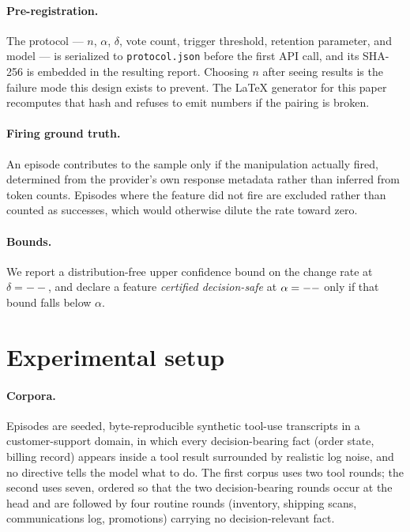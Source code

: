 \documentclass[11pt]{article}
\newcommand{\pcDelta}{--}\newcommand{\pcAnthropicAggressiveCleared}{--}%
\begin{document}
\paragraph{Pre-registration.}
The protocol --- $n$, $\alpha$, $\delta$, vote count, trigger threshold, retention
parameter, and model --- is serialized to \texttt{protocol.json} before the first
API call, and its SHA-256 is embedded in the resulting report. Choosing $n$ after
seeing results is the failure mode this design exists to prevent. The LaTeX
generator for this paper recomputes that hash and refuses to emit numbers if the
pairing is broken.

\paragraph{Firing ground truth.}
An episode contributes to the sample only if the manipulation actually fired,
determined from the provider's own response metadata rather than inferred from
token counts. Episodes where the feature did not fire are excluded rather than
counted as successes, which would otherwise dilute the rate toward zero.

\paragraph{Bounds.}
We report a distribution-free upper confidence bound on the change rate at
$\delta=\pcDelta$, and declare a feature \emph{certified decision-safe} at
$\alpha=--$ only if that bound falls below $\alpha$.

\section{Experimental setup}
\label{sec:setup}

\paragraph{Corpora.}
Episodes are seeded, byte-reproducible synthetic tool-use transcripts in a
customer-support domain, in which every decision-bearing fact (order state,
billing record) appears inside a tool result surrounded by realistic log noise, and
no directive tells the model what to do. The first corpus uses two tool rounds; the
second uses seven, ordered so that the two decision-bearing rounds occur at the
head and are followed by four routine rounds (inventory, shipping scans,
communications log, promotions) carrying no decision-relevant fact.
\end{document}

